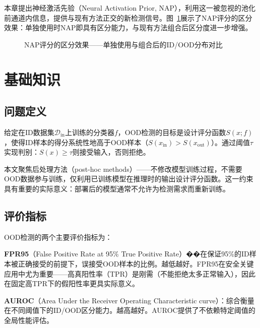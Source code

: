 本章提出神经激活先验（Neural Activation Prior, NAP），利用这一被忽视的池化前通道内信息，提供与现有方法正交的新检测信号。图~\ref{fig:nap-score-dist}展示了NAP评分的区分效果：单独使用时NAP即具有区分能力，与现有方法组合后区分度进一步增强。

\begin{figure}[htb]
  \centering
  \caption{NAP评分的区分效果——单独使用与组合后的ID/OOD分布对比}
  \label{fig:nap-score-dist}
\end{figure}


\section{基础知识}

\subsection{问题定义}

给定在ID数据集$\mathcal{D}_{\text{in}}$上训练的分类器$f$，OOD检测的目标是设计评分函数$S(x; f)$，使得ID样本的得分系统性地高于OOD样本（$S(x_{\text{in}}) > S(x_{\text{out}})$）。通过阈值$\tau$实现判别：$S(x) \geq \tau$则接受输入，否则拒绝。

本文聚焦后处理方法（post-hoc methods）——不修改模型训练过程，不需要OOD数据参与训练，仅利用已训练模型在推理时的输出设计评分函数。这一约束具有重要的实际意义：部署后的模型通常不允许为检测需求而重新训练。

\subsection{评价指标}

OOD检测的两个主要评价指标为：

\textbf{FPR95}（False Positive Rate at 95\% True Positive Rate）��在保证95\%的ID样本被正确接受的前提下，误接受OOD样本的比例。越低越好。FPR95在安全关键应用中尤为重要——高真阳性率（TPR）是刚需（不能拒绝太多正常输入），因此在固定高TPR下的假阳性率更具实际意义。

\textbf{AUROC}（Area Under the Receiver Operating Characteristic curve）：综合衡量在不同阈值下的ID/OOD区分能力。越高越好。AUROC提供了不依赖特定阈值的全局性能评估。


